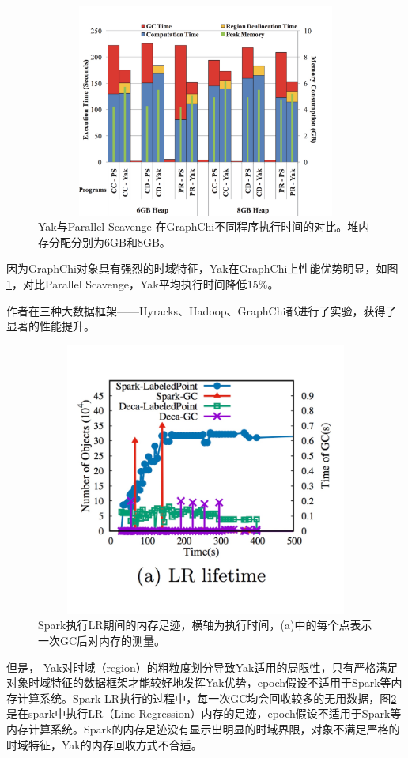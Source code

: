 \begin{figure}[h]
    \centering
    \includegraphics[width=12cm,height=7cm]{figure/evaluation1.jpg}
    \caption{
        Yak与Parallel Scavenge 在GraphChi不同程序执行时间的对比。堆内存分配分别为6GB和8GB。
    }
    \label{evaluation1}
\end{figure}

因为GraphChi对象具有强烈的时域特征，Yak在GraphChi上性能优势明显，如图\ref{evaluation1}，对比Parallel Scavenge，Yak平均执行时间降低15\%。

作者在三种大数据框架——Hyracks、Hadoop、GraphChi都进行了实验，获得了显著的性能提升。

\begin{figure}[h]
    \centering
    \includegraphics[width=12cm,height=9cm]{figure/evaluation2.png}
    \caption{
        Spark执行LR期间的内存足迹，横轴为执行时间，(a)中的每个点表示一次GC后对内存的测量。
    }
    \label{evaluation2}
\end{figure}
但是， Yak对时域（region）的粗粒度划分导致Yak适用的局限性，只有严格满足对象时域特征的数据框架才能较好地发挥Yak优势，epoch假设不适用于Spark等内存计算系统。Spark LR执行的过程中，每一次GC均会回收较多的无用数据，图\ref{evaluation2}是在spark中执行LR（Line Regression）内存的足迹，epoch假设不适用于Spark等内存计算系统。Spark的内存足迹没有显示出明显的时域界限，对象不满足严格的时域特征，Yak的内存回收方式不合适。

